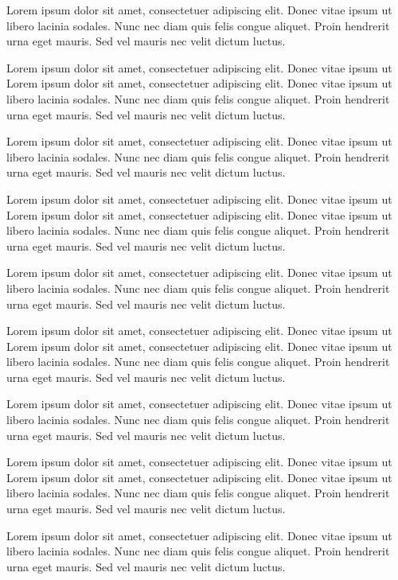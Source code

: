 Lorem ipsum dolor sit amet, consectetuer adipiscing elit. Donec vitae ipsum ut
libero lacinia sodales. Nunc nec diam quis felis congue aliquet. Proin hendrerit
urna eget mauris. Sed vel mauris nec velit dictum luctus.

Lorem ipsum dolor sit amet, consectetuer adipiscing elit. Donec vitae ipsum ut
Lorem ipsum dolor sit amet, consectetuer adipiscing elit. Donec vitae ipsum ut
libero lacinia sodales. Nunc nec diam quis felis congue aliquet. Proin hendrerit
urna eget mauris. Sed vel mauris nec velit dictum luctus.

Lorem ipsum dolor sit amet, consectetuer adipiscing elit. Donec vitae ipsum ut
libero lacinia sodales. Nunc nec diam quis felis congue aliquet. Proin hendrerit
urna eget mauris. Sed vel mauris nec velit dictum luctus.

Lorem ipsum dolor sit amet, consectetuer adipiscing elit. Donec vitae ipsum ut
Lorem ipsum dolor sit amet, consectetuer adipiscing elit. Donec vitae ipsum ut
libero lacinia sodales. Nunc nec diam quis felis congue aliquet. Proin hendrerit
urna eget mauris. Sed vel mauris nec velit dictum luctus.

Lorem ipsum dolor sit amet, consectetuer adipiscing elit. Donec vitae ipsum ut
libero lacinia sodales. Nunc nec diam quis felis congue aliquet. Proin hendrerit
urna eget mauris. Sed vel mauris nec velit dictum luctus.

Lorem ipsum dolor sit amet, consectetuer adipiscing elit. Donec vitae ipsum ut
Lorem ipsum dolor sit amet, consectetuer adipiscing elit. Donec vitae ipsum ut
libero lacinia sodales. Nunc nec diam quis felis congue aliquet. Proin hendrerit
urna eget mauris. Sed vel mauris nec velit dictum luctus.

Lorem ipsum dolor sit amet, consectetuer adipiscing elit. Donec vitae ipsum ut
libero lacinia sodales. Nunc nec diam quis felis congue aliquet. Proin hendrerit
urna eget mauris. Sed vel mauris nec velit dictum luctus.

Lorem ipsum dolor sit amet, consectetuer adipiscing elit. Donec vitae ipsum ut
Lorem ipsum dolor sit amet, consectetuer adipiscing elit. Donec vitae ipsum ut
libero lacinia sodales. Nunc nec diam quis felis congue aliquet. Proin hendrerit
urna eget mauris. Sed vel mauris nec velit dictum luctus.

Lorem ipsum dolor sit amet, consectetuer adipiscing elit. Donec vitae ipsum ut
libero lacinia sodales. Nunc nec diam quis felis congue aliquet. Proin hendrerit
urna eget mauris. Sed vel mauris nec velit dictum luctus.


